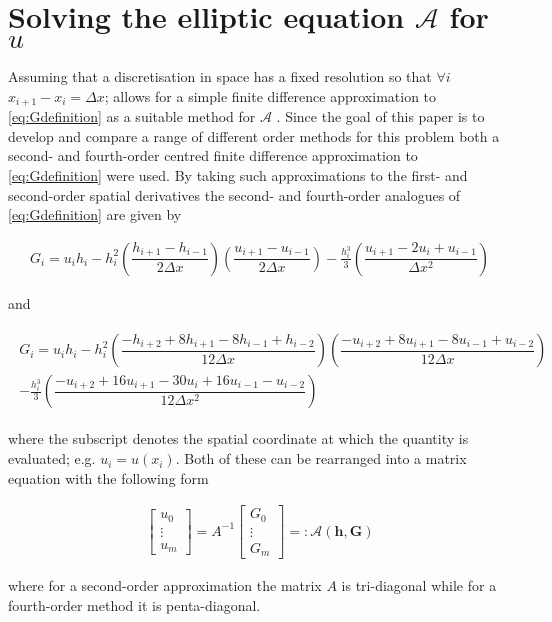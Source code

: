 \documentclass[SingleSpace,12pt,Proceedings]{Serre_ASCE}
\begin{document}
\section{Solving the elliptic equation $\mathcal{A}$ for $u$}
Assuming that a discretisation in space has a fixed resolution so that $\forall i$ $x_{i+1} - x_{i} = \Delta x$; allows for a simple finite difference approximation to \eqref{eq:Gdefinition} as a suitable method for $\mathcal{A}$ \cite{Hank-etal-2010-2034,Zoppou-2014}. Since the goal of this paper is to develop and compare a range of different order methods for this problem both a second- and fourth-order centred finite difference approximation to \eqref{eq:Gdefinition} were used. By taking such approximations to the first- and second-order spatial derivatives the second- and fourth-order analogues of \eqref{eq:Gdefinition} are given by
\begin{linenomath*}
\begin{gather*} %
G_i = u_ih_i - h_i^2 \left(\dfrac{h_{i+1} - h_{i-1}}{2\Delta x}\right) \left(\dfrac{u_{i+1} - u_{i-1}}{2\Delta x}\right) - \frac{h_i^3}{3} \left(\dfrac{u_{i+1} - 2 u_{i} + u_{i-1}}{\Delta x^2}\right)
\end{gather*}
\end{linenomath*}
and
\begin{linenomath*}
\begin{gather*}
\begin{split}
G_i = u_ih_i - h_i^2 \left(\dfrac{-h_{i+2} + 8h_{i+1} - 8h_{i-1} + h_{i-2}}{12\Delta x}\right) \left(\dfrac{-u_{i+2} + 8u_{i+1} - 8u_{i-1} + u_{i-2}}{12\Delta x}\right) \\ - \frac{h_i^3}{3} \left(\dfrac{-u_{i+2} + 16u_{i+1} - 30u_{i} + 16u_{i-1} - u_{i-2}}{12\Delta x^2}\right)&
\end{split}
\end{gather*}
\end{linenomath*}
where the subscript denotes the spatial coordinate at which the quantity is evaluated; e.g. $u_i = u(x_i)$. Both of these can be rearranged into a matrix equation with the following form 
\begin{linenomath*}
\begin{gather*}
\left[\begin{array}{c}
  u_0 \\
  \vdots \\
  u_m \end{array}\right] = A^{-1}
\left[\begin{array}{c}
 G_0 \\
 \vdots \\
 G_m \end{array}\right] =: \mathcal{A}(\boldsymbol{h},\boldsymbol{G})
\end{gather*}
\end{linenomath*}
where for a second-order approximation the matrix $A$ is tri-diagonal while for a fourth-order method it is penta-diagonal.
\end{document}
